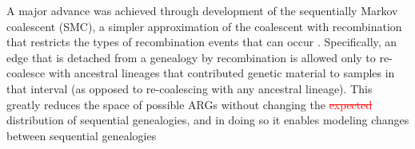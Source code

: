 \documentclass[11pt]{article}
\begin{document}
A major advance was achieved through development of the sequentially Markov 
coalescent (SMC), a simpler approximation of the coalescent with recombination
that restricts the types of recombination events that can occur 
\citep{mcvean2005approximating}. Specifically,
an edge that is detached from a genealogy by recombination is allowed only to
re-coalesce with ancestral lineages that contributed genetic material to samples
in that interval (as opposed to re-coalescing with any ancestral lineage). 
This greatly reduces the space of possible ARGs without changing the
\textcolor{red}{\sout{expected}}
distribution of sequential genealogies, and in doing so it enables modeling
changes between sequential genealogies
\end{document}
